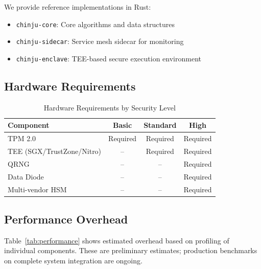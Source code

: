 \documentclass[11pt,a4paper]{article}
\begin{document}
We provide reference implementations in Rust:

\begin{itemize}
    \item \texttt{chinju-core}: Core algorithms and data structures
    \item \texttt{chinju-sidecar}: Service mesh sidecar for monitoring
    \item \texttt{chinju-enclave}: TEE-based secure execution environment
\end{itemize}

\subsection{Hardware Requirements}

\begin{table}[htbp]
\centering
\caption{Hardware Requirements by Security Level}
\label{tab:hardware}
\begin{tabular}{@{}lccc@{}}
\toprule
Component & Basic & Standard & High \\
\midrule
TPM 2.0 & Required & Required & Required \\
TEE (SGX/TrustZone/Nitro) & -- & Required & Required \\
QRNG & -- & -- & Required \\
Data Diode & -- & -- & Required \\
Multi-vendor HSM & -- & -- & Required \\
\bottomrule
\end{tabular}
\end{table}

\subsection{Performance Overhead}

Table~\ref{tab:performance} shows estimated overhead based on profiling of individual components.
These are preliminary estimates; production benchmarks on complete system integration are ongoing.
\end{document}
